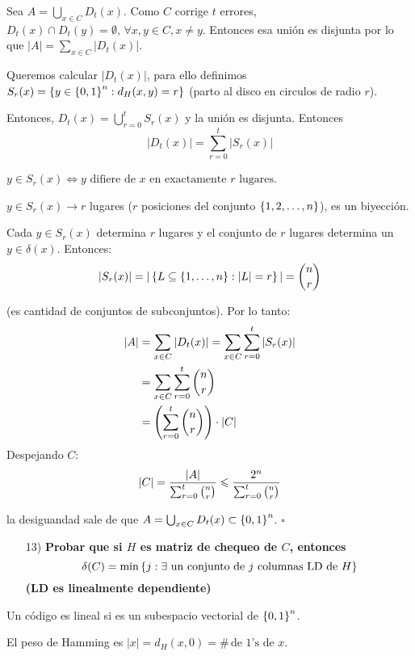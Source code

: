 \documentclass[12pt,a4paper]{article}
\begin{document}
Sea $A = \bigcup_{x\in C} D_{t}(x)$. Como $C$ corrige $t$ errores, 
$D_{t}(x) \cap D_{t}(y) = \emptyset,\, \forall x,y\in C, x\neq y$. Entonces esa 
unión es disjunta por lo que $|A| = \sum_{x\in C} |D_{t}(x)|$.
\medskip

Queremos calcular $|D_{t}(x)|$, para ello definimos $S_{r}(x) = \left\lbrace y\in \left\lbrace 0,1 \right\rbrace^{n}: d_{H}(x,y)=r \right\rbrace$ 
(parto al disco en circulos de radio $r$).
\medskip

Entonces, $D_{t}(x) = \bigcup_{r=0}^{t} S_{r}(x)$ y la unión es disjunta. Entonces 
$$|D_{t}(x)| = \sum_{r=0}^{t} |S_{r}(x)|$$

$y\in S_{r}(x) \iff y\,\, \text{difiere de $x$ en exactamente $r$ lugares}$.
\medskip

$y\in S_{r}(x) \to r$ lugares ($r$ posiciones del conjunto $\left\lbrace 1,2, \ldots, n \right\rbrace$), 
es un biyección.
\medskip

Cada $y\in S_{r}(x)$ determina $r$ lugares y el conjunto de $r$ lugares determina 
un $y\in \delta(x)$. Entonces:
$$|S_{r}(x)| = |\left\lbrace L \subseteq \left\lbrace 1,\ldots,n \right\rbrace:|L|=r \right\rbrace| = \binom{n}{r}$$

(es cantidad de conjuntos de subconjuntos). Por lo tanto:
\begin{align*}
    |A| &= \sum_{x\in C} |D_{t}(x)| = \sum_{x\in C} \sum_{r=0}^{t} |S_{r}(x)|\\
    &= \sum_{x\in C} \sum_{r=0}^{t} \binom{n}{r}\\
    &= \left(\sum_{r=0}^{t} \binom{n}{r}\right) \cdot |C|\\
\end{align*}
Despejando $C$:
$$|C| = \frac{|A|}{\sum_{r=0}^{t} \binom{n}{r}}\leqslant \frac{2^{n}}{\sum_{r=0}^{t} \binom{n}{r}}$$

la desiguandad sale de que $A = \bigcup_{x\in C} D_{t}(x) \subset \left\lbrace 0,1 \right\rbrace^{n}$.
$\square$

\begin{itemize}
    \item [13)] \textbf{Probar que si $H$ es matriz de chequeo de $C$, entonces
        $$\delta(C) = \min \left\lbrace j: \exists \,\,\text{un conjunto de $j$ columnas LD de $H$} \right\rbrace$$
        (LD es linealmente dependiente)}
    \label{dem:delta}
\end{itemize}

Un código es lineal si es un subespacio vectorial de $\left\lbrace 0,1 \right\rbrace^{n}$.

\begin{definition} El peso de Hamming es $|x|=d_{H}(x,0)=\# \, \text{de 1's de $x$}$.
\end{definition}
\end{document}
